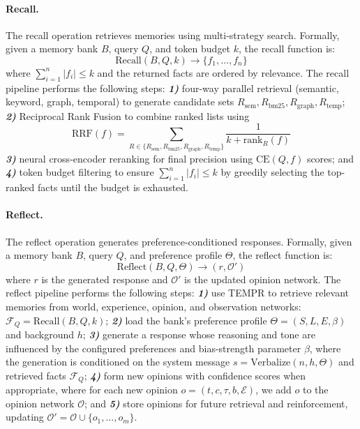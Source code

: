 \paragraph{Recall.}

The recall operation retrieves memories using multi-strategy search. Formally, given a memory bank $B$, query $Q$, and token budget $k$, the recall function is:
\begin{equation}
\text{Recall}(B, Q, k) \rightarrow \{f_1, \ldots, f_n\}
\end{equation}
where $\sum_{i=1}^n |f_i| \leq k$ and the returned facts are ordered by relevance. The recall pipeline performs the following steps: \textbf{\textit{1)}} four-way parallel retrieval (semantic, keyword, graph, temporal) to generate candidate sets $R_{\text{sem}}, R_{\text{bm25}}, R_{\text{graph}}, R_{\text{temp}}$; \textbf{\textit{2)}} Reciprocal Rank Fusion to combine ranked lists using
\begin{equation}
\text{RRF}(f) = \sum_{R \in \{R_{\text{sem}}, R_{\text{bm25}}, R_{\text{graph}}, R_{\text{temp}}\}} \frac{1}{k + \text{rank}_R(f)}
\end{equation}
\textbf{\textit{3)}} neural cross-encoder reranking for final precision using $\text{CE}(Q, f)$ scores; and \textbf{\textit{4)}} token budget filtering to ensure $\sum_{i=1}^n |f_i| \leq k$ by greedily selecting the top-ranked facts until the budget is exhausted.

\paragraph{Reflect.}

The reflect operation generates preference-conditioned responses. Formally, given a memory bank $B$, query $Q$, and preference profile $\Theta$, the reflect function is:
\begin{equation}
\text{Reflect}(B, Q, \Theta) \rightarrow (r, \mathcal{O}')
\end{equation}
where $r$ is the generated response and $\mathcal{O}'$ is the updated opinion network. The reflect pipeline performs the following steps: \textbf{\textit{1)}} use TEMPR to retrieve relevant memories from world, experience, opinion, and observation networks: $\mathcal{F}_Q = \text{Recall}(B, Q, k)$; \textbf{\textit{2)}} load the bank's preference profile $\Theta = (S, L, E, \beta)$ and background $h$; \textbf{\textit{3)}} generate a response whose reasoning and tone are influenced by the configured preferences and bias-strength parameter $\beta$, where the generation is conditioned on the system message $s = \text{Verbalize}(n, h, \Theta)$ and retrieved facts $\mathcal{F}_Q$; \textbf{\textit{4)}} form new opinions with confidence scores when appropriate, where for each new opinion $o = (t, c, \tau, b, \mathcal{E})$, we add $o$ to the opinion network $\mathcal{O}$; and \textbf{\textit{5)}} store opinions for future retrieval and reinforcement, updating $\mathcal{O}' = \mathcal{O} \cup \{o_1, \ldots, o_m\}$.

